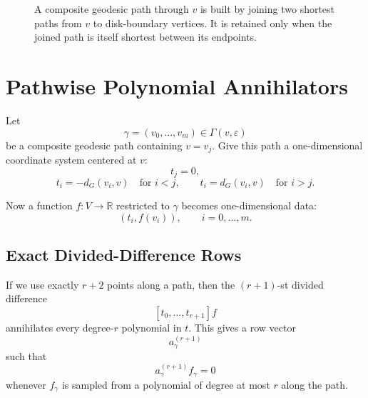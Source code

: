 \documentclass[11pt]{article}
\newcommand{\R}{\mathbb R}
\newcommand{\Geo}{\Gamma}
\newcommand{\eps}{\varepsilon}
\begin{document}
\begin{figure}[ht]
\centering
{}
\caption{A composite geodesic path through \(v\) is built by joining two
shortest paths from \(v\) to disk-boundary vertices.  It is retained only when
the joined path is itself shortest between its endpoints.}
\end{figure}

\section{Pathwise Polynomial Annihilators}

Let
\[
  \gamma=(v_0,\ldots,v_m)\in \Geo(v,\eps)
\]
be a composite geodesic path containing \(v=v_j\).  Give this path a
one-dimensional coordinate system centered at \(v\):
\[
  t_j=0,
\]
\[
  t_i=-d_G(v_i,v)\quad \text{for } i<j,
  \qquad
  t_i=d_G(v_i,v)\quad \text{for } i>j.
\]

Now a function \(f:V\to\R\) restricted to \(\gamma\) becomes one-dimensional
data:
\[
  (t_i, f(v_i)),\qquad i=0,\ldots,m.
\]

\subsection{Exact Divided-Difference Rows}

If we use exactly \(r+2\) points along a path, then the \((r+1)\)-st divided
difference
\[
  [t_0,\ldots,t_{r+1}]f
\]
annihilates every degree-\(r\) polynomial in \(t\).  This gives a row vector
\[
  a_{\gamma}^{(r+1)}
\]
such that
\[
  a_{\gamma}^{(r+1)} f_\gamma = 0
\]
whenever \(f_\gamma\) is sampled from a polynomial of degree at most \(r\)
along the path.
\end{document}
